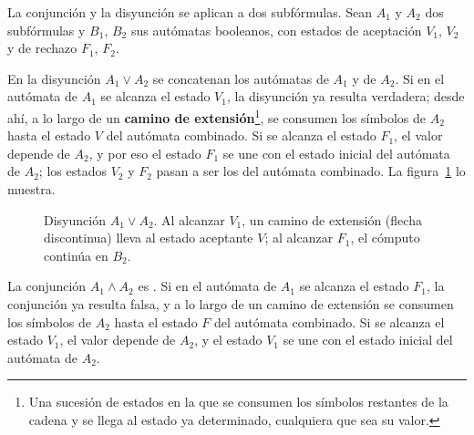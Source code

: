 \documentclass{report}
\theoremstyle{definition}
\theoremstyle{plain}
\theoremstyle{remark}
\begin{document}
La conjunción y la disyunción se aplican a dos subfórmulas. Sean $A_1$ y
$A_2$ dos subfórmulas y $B_1$, $B_2$ sus autómatas booleanos, con estados
de aceptación $V_1$, $V_2$ y de rechazo $F_1$, $F_2$.

En la disyunción $A_1 \vee A_2$ se concatenan los autómatas de $A_1$ y de
$A_2$. Si en el autómata de $A_1$ se alcanza el estado $V_1$, la
disyunción ya resulta verdadera; desde ahí, a lo largo de un \textbf{camino
  de extensión}\footnote{Una sucesión de estados en la que se consumen los
  símbolos restantes de la cadena y se llega al estado ya determinado,
  cualquiera que sea su valor.}, se consumen los símbolos de $A_2$ hasta el
estado $V$ del autómata combinado. Si se alcanza el estado $F_1$, el valor depende de
$A_2$, y por eso el estado $F_1$ se une con el estado inicial del
autómata de $A_2$; los estados $V_2$ y $F_2$ pasan a ser los del autómata
combinado. La figura~\ref{fig:automata-disyuncion} lo muestra.

\begin{figure}[ht]
  \centering
  \caption{Disyunción $A_1 \vee A_2$. Al alcanzar $V_1$, un camino de
    extensión (flecha discontinua) lleva al estado aceptante $V$; al
    alcanzar $F_1$, el cómputo continúa en $B_2$.}
  \label{fig:automata-disyuncion}
\end{figure}

La conjunción $A_1 \wedge A_2$ es . Si en el autómata de $A_1$
se alcanza el estado $F_1$, la conjunción ya resulta falsa, y a lo largo
de un camino de extensión se consumen los símbolos de $A_2$ hasta el
estado $F$ del autómata combinado. Si se alcanza el estado $V_1$, el
valor depende de $A_2$, y el estado $V_1$ se une con el estado inicial
del autómata de $A_2$. 
\end{document}
